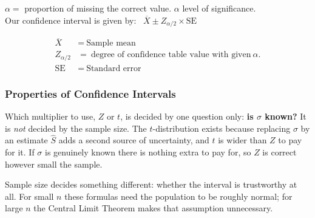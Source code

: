 \documentclass[11pt,a4paper]{article}
\theoremstyle{definition}
\begin{document}
$\alpha=$ proportion of missing the correct value. $\alpha$ level of significance.\\[1ex] Our confidence interval is given by: \ $\overline{X}\pm Z_{\alpha/2}\times \text{SE}$

\begin{align*}
\overline{X} &=\  \text{Sample mean}\\
Z_{\alpha/2} &=\ \text{degree of confidence table value with given}\ \alpha.\\
\text{SE} &=\ \text{Standard error}
\end{align*}







\subsubsection{Properties of Confidence Intervals}

Which multiplier to use, $Z$ or $t$, is decided by one question only: \textbf{is $\sigma$
known?} It is \emph{not} decided by the sample size. The $t$-distribution exists because
replacing $\sigma$ by an estimate $\hat{S}$ adds a second source of uncertainty, and
$t$ is wider than $Z$ to pay for it. If $\sigma$ is genuinely known there is nothing extra
to pay for, so $Z$ is correct however small the sample.

Sample size decides something different: whether the interval is trustworthy at all. For
small $n$ these formulas need the population to be roughly normal; for large $n$ the
Central Limit Theorem makes that assumption unnecessary.
\end{document}
